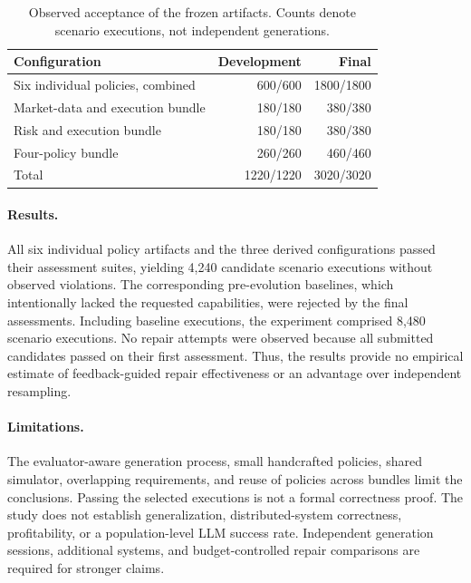 \begin{table}[t]
\centering
\caption{Observed acceptance of the frozen artifacts. Counts denote scenario
executions, not independent generations.}
\label{tab:preliminary-results}
\begin{tabular}{lrr}
\hline
Configuration & Development & Final \\
\hline
Six individual policies, combined & 600/600 & 1800/1800 \\
Market-data and execution bundle & 180/180 & 380/380 \\
Risk and execution bundle & 180/180 & 380/380 \\
Four-policy bundle & 260/260 & 460/460 \\
\hline
Total & 1220/1220 & 3020/3020 \\
\hline
\end{tabular}
\end{table}

\paragraph{Results.}
All six individual policy artifacts and the three derived configurations
passed their assessment suites, yielding 4,240 candidate scenario executions
without observed violations. The corresponding pre-evolution baselines,
which intentionally lacked the requested capabilities, were rejected by
the final assessments. Including baseline executions, the experiment
comprised 8,480 scenario executions. No repair attempts were observed because
all submitted candidates passed on their first assessment. Thus, the results
provide no empirical estimate of feedback-guided repair effectiveness or
an advantage over independent resampling.

\paragraph{Limitations.}
The evaluator-aware generation process, small handcrafted policies,
shared simulator, overlapping requirements, and reuse of policies across
bundles limit the conclusions. Passing the selected executions is not a
formal correctness proof. The study does not establish generalization,
distributed-system correctness, profitability, or a population-level LLM
success rate. Independent generation sessions, additional systems, and
budget-controlled repair comparisons are required for stronger claims.
